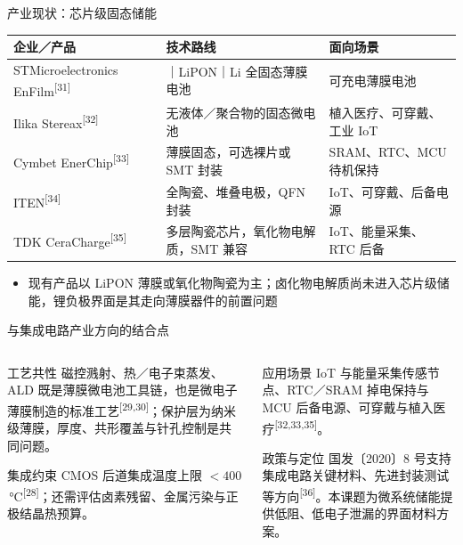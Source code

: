 \documentclass[aspectratio=169,10pt]{beamer}
\renewcommand{\cite}[1]{\textsuperscript{\color{NJUMuted}[#1]}}
\newenvironment{decktable}
  {\par\fontsize{8.3}{10.8}\selectfont\renewcommand{\arraystretch}{1.22}}
  {\par}
\begin{document}
\begin{frame}[t]{产业现状：芯片级固态储能}
\begin{decktable}
\begin{tabular}{@{}L{.25\textwidth}L{.37\textwidth}L{.30\textwidth}@{}}
  \toprule
  企业／产品 & 技术路线 & 面向场景 \\
  \midrule
  STMicroelectronics EnFilm\cite{31} & ｜LiPON｜Li 全固态薄膜电池 & 可充电薄膜电池 \\
  Ilika Stereax\cite{32} & 无液体／聚合物的固态微电池 & 植入医疗、可穿戴、工业 IoT \\
  Cymbet EnerChip\cite{33} & 薄膜固态，可选裸片或 SMT 封装 & SRAM、RTC、MCU 待机保持 \\
  ITEN\cite{34} & 全陶瓷、堆叠电极，QFN 封装 & IoT、可穿戴、后备电源 \\
  TDK CeraCharge\cite{35} & 多层陶瓷芯片，氧化物电解质，SMT 兼容 & IoT、能量采集、RTC 后备 \\
  \bottomrule
\end{tabular}
\end{decktable}

\begin{itemize}
  \item 现有产品以 LiPON 薄膜或氧化物陶瓷为主；卤化物电解质尚未进入芯片级储能，\alert{锂负极界面}是其走向薄膜器件的前置问题
\end{itemize}
\end{frame}

\begin{frame}[t]{与集成电路产业方向的结合点}
\begin{columns}[T,onlytextwidth]
  \begin{column}{.48\textwidth}
    \begin{njuquote}{工艺共性}
      磁控溅射、热／电子束蒸发、ALD 既是薄膜微电池工具链，也是微电子薄膜制造的标准工艺\cite{29,30}；保护层为纳米级薄膜，厚度、共形覆盖与针孔控制是共同问题。
    \end{njuquote}
    \begin{njuquotered}{集成约束}
      CMOS 后道集成温度上限 $<400$\,°C\cite{28}；还需评估卤素残留、金属污染与正极结晶热预算。
    \end{njuquotered}
  \end{column}
  \begin{column}{.48\textwidth}
    \begin{njuquoteblue}{应用场景}
      IoT 与能量采集传感节点、RTC／SRAM 掉电保持与 MCU 后备电源、可穿戴与植入医疗\cite{32,33,35}。
    \end{njuquoteblue}
    \begin{njuquotegold}{政策与定位}
      国发〔2020〕8 号支持集成电路关键材料、先进封装测试等方向\cite{36}。本课题为微系统储能提供\alert{低阻、低电子泄漏}的界面材料方案。
    \end{njuquotegold}
  \end{column}
\end{columns}
\end{frame}
\end{document}
